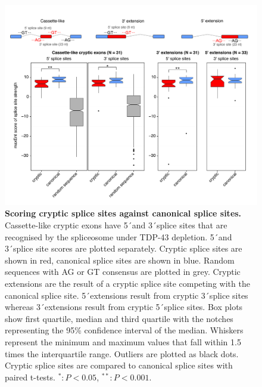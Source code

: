 \begin{figure}[h!]
	\centering
	\includegraphics[width=\textwidth]{Figures/03_cryptic_exons/Figure_6_splice_site_scoring.png}
	\caption[Scoring cryptic splice sites against canonical splice sites]{
		\textbf{Scoring cryptic splice sites against canonical splice sites.}
		Cassette-like cryptic exons have 5\'\ and 3\'\ splice sites that are recognised by the spliceosome under TDP-43 depletion. 5\'\ and 3\'\ splice site scores are plotted separately. Cryptic splice sites are shown in red, canonical splice sites are shown in blue. Random sequences with AG or GT consensus are plotted in grey. Cryptic extensions are the result of a cryptic splice site competing with the canonical splice site. 5\'\ extensions result from cryptic 3\'\ splice sites whereas 3\'\ extensions result from cryptic 5\'\ splice sites. Box plots show first quartile, median and third quartile with the notches representing the 95\% confidence interval of the median. Whiskers represent the minimum and maximum values that fall within 1.5 times the interquartile range. Outliers are plotted as black dots. Cryptic splice sites are compared to canonical splice sites with paired t-tests. $^{*}: P < 0.05$, $^{**}: P < 0.001$.
}
	\label{fig:cryptic_scoring}
\end{figure}

